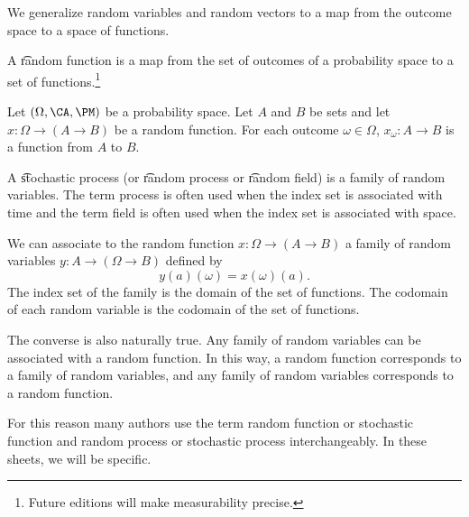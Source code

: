 

We generalize random variables and random vectors to a map from the outcome space to a space of functions.


A \t{random function} is a map from the set of outcomes of a probability space to a set of functions.\footnote{Future editions will make measurability precise.}


Let $(\Omega, \CA, \PM)$ be a probability space.
Let $A$ and $B$ be sets and let $x: \Omega \to (A \to B)$ be a random function.
For each outcome $\omega \in \Omega$, $x_{\omega}: A \to B$ is a function from $A$ to $B$.


A \t{stochastic process} (or \t{random process} or \t{random field}) is a family of random variables.
The term process is often used when the index set is associated with time and the term field is often used when the index set is associated with space.

We can associate to the random function $x: \Omega \to (A \to B)$ a family of random variables $y: A \to (\Omega \to B)$ defined by
\[
  y(a)(\omega) = x(\omega)(a).
\]
The index set of the family is the domain of the set of functions.
The codomain of each random variable is the codomain of the set of functions.

The converse is also naturally true.
Any family of random variables can be associated with a random function.
In this way, a random function corresponds to a family of random variables, and any family of random variables corresponds to a random function.

For this reason many authors use the term random function or stochastic function and random process or stochastic process interchangeably.
In these sheets, we will be specific.

